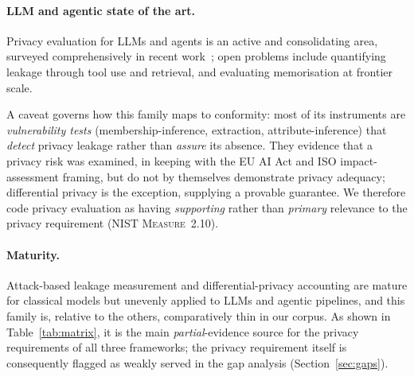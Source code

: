 \paragraph{LLM and agentic state of the art.} Privacy evaluation for LLMs and agents is an
active and consolidating area, surveyed comprehensively in recent
work~\cite{neel2023privacy}; open problems include quantifying leakage through tool use and
retrieval, and evaluating memorisation at frontier scale.

A caveat governs how this family maps to conformity: most of its instruments are
\emph{vulnerability tests} (membership-inference, extraction, attribute-inference) that
\emph{detect} privacy leakage rather than \emph{assure} its absence. They evidence that a
privacy risk was examined, in keeping with the EU AI Act and ISO impact-assessment framing, but do not by
themselves demonstrate privacy adequacy; differential privacy is the exception, supplying a
provable guarantee. We therefore code privacy evaluation as having \emph{supporting} rather
than \emph{primary} relevance to the privacy requirement (NIST \textsc{Measure}~2.10).

\paragraph{Maturity.} Attack-based leakage measurement and differential-privacy accounting
are mature for classical models but unevenly applied to LLMs and agentic pipelines, and
this family is, relative to the others, comparatively thin in our corpus. As shown in
Table~\ref{tab:matrix}, it is the main \emph{partial}-evidence source for the privacy
requirements of all three frameworks; the privacy requirement itself is consequently
flagged as weakly served in the gap analysis (Section~\ref{sec:gaps}).
